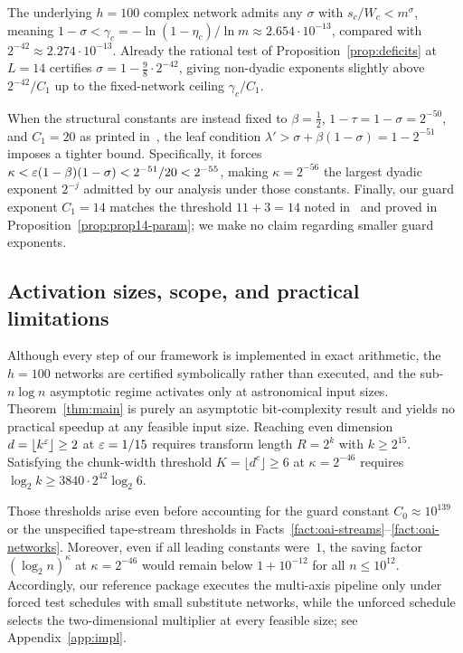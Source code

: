 The underlying $h=100$ complex network admits any $\sigma$ with $s_c/W_c<m^\sigma$, meaning $1-\sigma<\gamma_c=-\ln(1-\eta_c)/\ln m\approx 2.654\cdot 10^{-13}$, compared with $2^{-42}\approx 2.274\cdot 10^{-13}$. Already the rational test of Proposition~\ref{prop:deficits} at $L=14$ certifies $\sigma=1-\frac98\cdot 2^{-42}$, giving non-dyadic exponents slightly above $2^{-42}/C_1$ up to the fixed-network ceiling $\gamma_c/C_1$.

When the structural constants are instead fixed to $\beta=\frac12$, $1-\tau=1-\sigma=2^{-50}$, and $C_1=20$ as printed in~\cite[Prop.~14]{OAI26}, the leaf condition $\lambda'>\sigma+\beta(1-\sigma)=1-2^{-51}$ imposes a tighter bound. Specifically, it forces $\kappa<\varepsilon(1-\beta)(1-\sigma)<2^{-51}/20<2^{-55}$, making $\kappa=2^{-56}$ the largest dyadic exponent $2^{-j}$ admitted by our analysis under those constants. Finally, our guard exponent $C_1=14$ matches the threshold $11+3=14$ noted in~\cite[\S5.4]{OAI26} and proved in Proposition~\ref{prop:prop14-param}; we make no claim regarding smaller guard exponents.

\subsection{Activation sizes, scope, and practical limitations}\label{sec:disc-limitations}\label{sec:disc-perm}

Although every step of our framework is implemented in exact arithmetic, the $h=100$ networks are certified symbolically rather than executed, and the sub-$n\log n$ asymptotic regime activates only at astronomical input sizes. Theorem~\ref{thm:main} is purely an asymptotic bit-complexity result and yields no practical speedup at any feasible input size. Reaching even dimension $d=\lfloor k^\varepsilon\rfloor\ge 2$ at $\varepsilon=1/15$ requires transform length $R=2^k$ with $k\ge 2^{15}$. Satisfying the chunk-width threshold $K=\lfloor d^c\rfloor\ge 6$ at $\kappa=2^{-46}$ requires $\log_2 k\ge 3840\cdot 2^{42}\log_2 6$.

Those thresholds arise even before accounting for the guard constant $C_0\approx 10^{139}$ or the unspecified tape-stream thresholds in Facts~\ref{fact:oai-streams}--\ref{fact:oai-networks}. Moreover, even if all leading constants were~$1$, the saving factor $(\log_2 n)^\kappa$ at $\kappa=2^{-46}$ would remain below $1+10^{-12}$ for all $n\le 10^{12}$. Accordingly, our reference package executes the multi-axis pipeline only under forced test schedules with small substitute networks, while the unforced schedule selects the two-dimensional multiplier at every feasible size; see Appendix~\ref{app:impl}.

